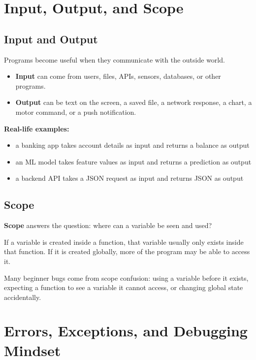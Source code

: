 \documentclass[12pt, a4paper, oneside]{book}
\begin{document}
\section{Input, Output, and Scope}

\subsection{Input and Output}
Programs become useful when they communicate with the outside world.
\begin{itemize}[leftmargin=2em]
    \item \textbf{Input} can come from users, files, APIs, sensors, databases, or other programs.
    \item \textbf{Output} can be text on the screen, a saved file, a network response, a chart, a motor command, or a push notification.
\end{itemize}

\textbf{Real-life examples:}
\begin{itemize}[leftmargin=2em]
    \item a banking app takes account details as input and returns a balance as output
    \item an ML model takes feature values as input and returns a prediction as output
    \item a backend API takes a JSON request as input and returns JSON as output
\end{itemize}

\subsection{Scope}
\textbf{Scope} answers the question: where can a variable be seen and used?

If a variable is created inside a function, that variable usually only exists inside that function. If it is created globally, more of the program may be able to access it.

\begin{warningbox}
Many beginner bugs come from scope confusion: using a variable before it exists, expecting a function to see a variable it cannot access, or changing global state accidentally.
\end{warningbox}

\section{Errors, Exceptions, and Debugging Mindset}
\end{document}
